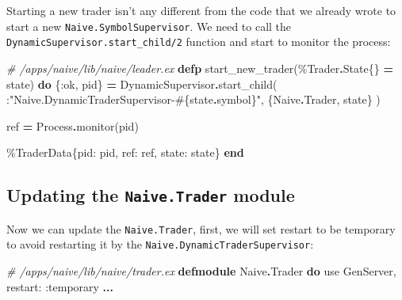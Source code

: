 \documentclass[
]{book}
\newenvironment{Shaded}{\begin{snugshade}}{\end{snugshade}}
\newcommand{\CommentTok}[1]{\textcolor[rgb]{0.56,0.35,0.01}{\textit{#1}}}
\newcommand{\ConstantTok}[1]{\textcolor[rgb]{0.00,0.00,0.00}{#1}}
\newcommand{\ImportTok}[1]{#1}
\newcommand{\KeywordTok}[1]{\textcolor[rgb]{0.13,0.29,0.53}{\textbf{#1}}}
\newcommand{\NormalTok}[1]{#1}
\newcommand{\OperatorTok}[1]{\textcolor[rgb]{0.81,0.36,0.00}{\textbf{#1}}}
\newcommand{\OtherTok}[1]{\textcolor[rgb]{0.56,0.35,0.01}{#1}}
\newcommand{\StringTok}[1]{\textcolor[rgb]{0.31,0.60,0.02}{#1}}
\newcommand{\VariableTok}[1]{\textcolor[rgb]{0.00,0.00,0.00}{#1}}
\begin{document}
Starting a new trader isn't any different from the code that we already wrote to start a new \texttt{Naive.SymbolSupervisor}. We need to call the \texttt{DynamicSupervisor.start\_child/2} function and start to monitor the process:

\begin{Shaded}
\begin{Highlighting}[]
  \CommentTok{\# /apps/naive/lib/naive/leader.ex}
  \KeywordTok{defp}\NormalTok{ start\_new\_trader(\%}\ConstantTok{Trader}\OperatorTok{.}\ConstantTok{State}\NormalTok{\{\} }\OperatorTok{=}\NormalTok{ state) }\KeywordTok{do}
\NormalTok{    \{}\VariableTok{:ok}\NormalTok{, pid\} }\OperatorTok{=}
      \ConstantTok{DynamicSupervisor}\OperatorTok{.}\NormalTok{start\_child(}
\NormalTok{        :}\StringTok{"Naive.DynamicTraderSupervisor{-}}\OtherTok{\#\{}\NormalTok{state}\OperatorTok{.}\NormalTok{symbol}\OtherTok{\}}\StringTok{"}\NormalTok{,}
\NormalTok{        \{}\ConstantTok{Naive}\OperatorTok{.}\ConstantTok{Trader}\NormalTok{, state\}}
\NormalTok{      )}

\NormalTok{    ref }\OperatorTok{=} \ConstantTok{Process}\OperatorTok{.}\NormalTok{monitor(pid)}

\NormalTok{    \%}\ConstantTok{TraderData}\NormalTok{\{}\VariableTok{pid:}\NormalTok{ pid, }\VariableTok{ref:}\NormalTok{ ref, }\VariableTok{state:}\NormalTok{ state\}}
  \KeywordTok{end}
\end{Highlighting}
\end{Shaded}

\hypertarget{updating-the-naive.trader-module}{%
\subsection{\texorpdfstring{Updating the \texttt{Naive.Trader} module}{Updating the Naive.Trader module}}\label{updating-the-naive.trader-module}}

Now we can update the \texttt{Naive.Trader}, first, we will set restart to be temporary to avoid restarting it by the \texttt{Naive.DynamicTraderSupervisor}:

\begin{Shaded}
\begin{Highlighting}[]
\CommentTok{\# /apps/naive/lib/naive/trader.ex}
\KeywordTok{defmodule} \ConstantTok{Naive}\OperatorTok{.}\ConstantTok{Trader} \KeywordTok{do}
  \ImportTok{use} \ConstantTok{GenServer}\NormalTok{, }\VariableTok{restart:} \VariableTok{:temporary}
  \OperatorTok{...}
\end{Highlighting}
\end{Shaded}
\end{document}
